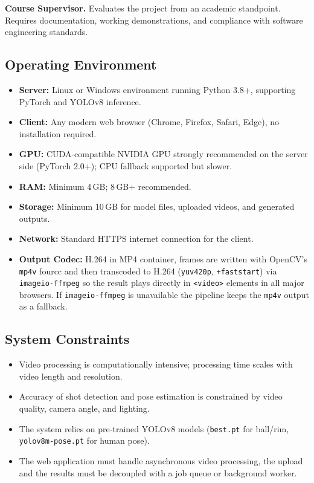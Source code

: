 ﻿\documentclass[11pt,a4paper]{article}
\begin{document}
\textbf{Course Supervisor.} Evaluates the project from an academic standpoint. Requires documentation, working demonstrations, and compliance with software engineering standards.

\subsection{Operating Environment}
\begin{itemize}[leftmargin=*]
    \item \textbf{Server:} Linux or Windows environment running Python 3.8+, supporting PyTorch and YOLOv8 inference.
    \item \textbf{Client:} Any modern web browser (Chrome, Firefox, Safari, Edge), no installation required.
    \item \textbf{GPU:} CUDA-compatible NVIDIA GPU strongly recommended on the server side (PyTorch 2.0+); CPU fallback supported but slower.
    \item \textbf{RAM:} Minimum 4\,GB; 8\,GB+ recommended.
    \item \textbf{Storage:} Minimum 10\,GB for model files, uploaded videos, and generated outputs.
    \item \textbf{Network:} Standard HTTPS internet connection for the client.
    \item \textbf{Output Codec:} H.264 in MP4 container, frames are written with OpenCV's \texttt{mp4v} fourcc and then transcoded to H.264 (\texttt{yuv420p}, \texttt{+faststart}) via \texttt{imageio-ffmpeg} so the result plays directly in \texttt{<video>} elements in all major browsers. If \texttt{imageio-ffmpeg} is unavailable the pipeline keeps the \texttt{mp4v} output as a fallback.
\end{itemize}

\subsection{System Constraints}
\begin{itemize}[leftmargin=*]
    \item Video processing is computationally intensive; processing time scales with video length and resolution.
    \item Accuracy of shot detection and pose estimation is constrained by video quality, camera angle, and lighting.
    \item The system relies on pre-trained YOLOv8 models (\texttt{best.pt} for ball/rim, \texttt{yolov8m-pose.pt} for human pose).
    \item The web application must handle asynchronous video processing, the upload and the results must be decoupled with a job queue or background worker.
\end{itemize}
\end{document}
